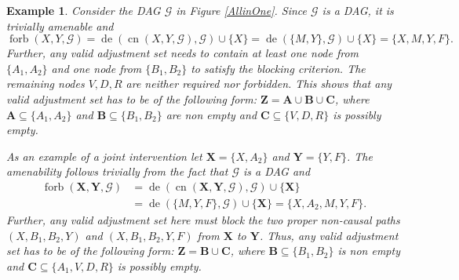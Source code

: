 \documentclass[11pt,a4paper]{article}
\newtheorem{Example}[Satz]{Example}
\theoremstyle{definition}
\theoremstyle{remark}
\DeclareMathOperator{\Forbb}{forb}
\DeclareMathOperator{\de}{de}
\DeclareMathOperator{\CN}{cn}
\DeclareMathOperator{\Cov}{Cov}
\newcommand{\g}[1][G]{\mathcal{#1}}
\newcommand{\f}[2][X,Y]{\Forbb(#1,#2)}
\newcommand{\fb}[2][X,Y]{\Forbb(\mathbf{#1},#2)}
\newcommand{\cn}[2][X,Y]{\CN(#1,#2)}
\newcommand{\cnb}[2][X,Y]{\CN(\mathbf{#1},#2)}
\begin{document}
\begin{Example}
	\label{ex: introduction figure explained}
	Consider the DAG $\g$ in Figure \ref{AllinOne}. Since $\g$ is a DAG, it is trivially amenable and 
	\[
	\f{\g} = \de(\cn{\g},\g) \cup \{X\} = \de(\{M,Y\},\g) \cup \{X\}= \{X,M,Y,F\}.
	\]
	Further, any valid adjustment set needs to contain at least one node from $\{A_1,A_2\}$ and one node from $\{B_1,B_2\}$ to satisfy the blocking criterion. The remaining nodes $V,D,R$ are neither required nor forbidden. This shows that any valid adjustment set has to be of the following form:  
	$\mathbf{Z} = \mathbf{A} \cup \mathbf{B} \cup \mathbf{C}$, where $\mathbf{A} \subseteq \{A_1,A_2\}$ and $\mathbf{B} \subseteq \{B_1, B_2\}$ are non empty and $\mathbf{C} \subseteq \{V,D,R \}$ is possibly empty. 
	
	As an example of a joint intervention let $\mathbf{X} = \{X,A_2\}$ and $\mathbf{Y}=\{Y,F\}$. The amenability follows trivially from the fact that $\g$ is a DAG and
	\begin{align*}
	\fb{\g} &= \de(\cnb{\g},\g) \cup \{\mathbf{X}\} \\ 
	&= \de(\{M,Y,F\},\g) \cup \{\mathbf{X}\}= \{X,A_2,M,Y,F\}. 
	\end{align*}
	Further,  any valid adjustment set here must block the two proper non-causal paths $(X,B_1,B_2,Y)$ and $(X,B_1,B_2,Y,F)$ from $\mathbf{X}$ to $\mathbf{Y}$. Thus, any valid adjustment set has to be of the following form:  
	$\mathbf{Z} = \mathbf{B} \cup \mathbf{C}$, where $\mathbf{B} \subseteq \{B_1, B_2\}$ is non empty and $\mathbf{C} \subseteq \{A_1,V,D,R \}$ is possibly empty. 
\end{Example}
 
 

 	
\end{document}
